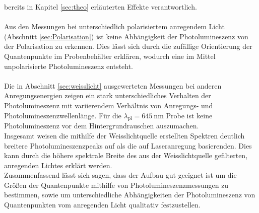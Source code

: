 bereits in Kapitel \ref{sec:theo} erläuterten Effekte verantwortlich. \\
\\
Aus den Messungen bei unterschiedlich polarisiertem anregendem Licht
(Abschnitt \ref{sec:Polarisation}) ist keine Abhängigkeit der Photolumineszenz
von der Polarisation zu erkennen. Dies lässt sich durch die zufällige Orientierung
der Quantenpunkte im Probenbehälter erklären, wodurch eine im Mittel unpolarisierte Photolumineszenz entsteht.\\
\\
Die in Abschnitt \ref{sec:weisslicht} ausgewerteten Messungen bei anderen Anregungsenergien
zeigen ein stark unterschiedliches Verhalten der Photolumineszenz
mit variierendem Verhältnis von Anregungs- und Photolumineszenzwellenlänge.
Für die $\lambda_{\text{pl}} = \SI{645}{\nano\meter}$ Probe ist keine Photolumineszenz
vor dem Hintergrundrauschen auszumachen. \\
Insgesamt weisen die mithilfe der Weisslichtquelle erstellten Spektren deutlich breitere
Photolumineszenzpeaks auf als die auf Laseranregung basierenden. Dies kann durch die
höhere spektrale Breite des aus der Weisslichtquelle gefilterten, anregenden Lichtes erklärt werden.\\

Zusammenfassend lässt sich sagen, dass der Aufbau gut geeignet ist um die Größen der
Quantenpunkte mithilfe von Photolumineszenzmessungen zu bestimmen, sowie um unterschiedliche
Abhängigkeiten der Photolumineszenz von Quantenpunkten vom anregenden Licht qualitativ festzustellen.
%
%

